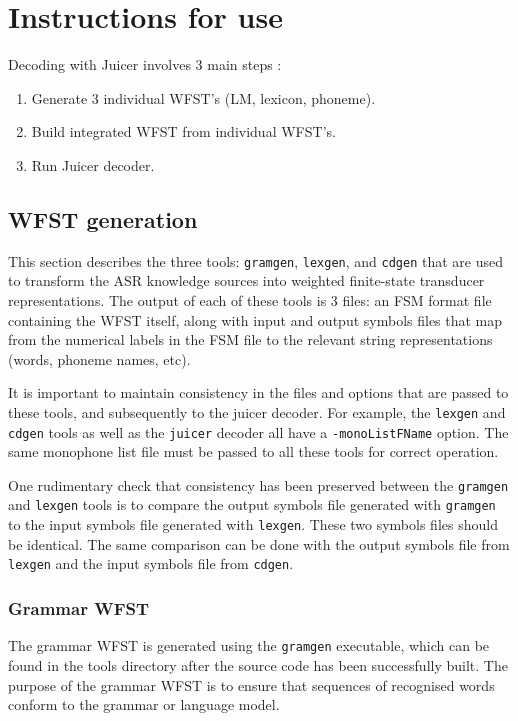 \documentclass[a4paper,12pt]{report}
\begin{document}
\chapter{Instructions for use}

Decoding with Juicer involves 3 main steps :

\begin{enumerate}
\item Generate 3 individual WFST's (LM, lexicon, phoneme).
\item Build integrated WFST from individual WFST's.
\item Run Juicer decoder.
\end{enumerate}

\section{WFST generation}

This section describes the three tools: {\tt gramgen}, {\tt lexgen}, and {\tt cdgen} that are used to transform the ASR knowledge sources into weighted finite-state transducer representations. The output of each of these tools is 3 files: an FSM format file~\cite{attfsmformats} containing the WFST itself, along with input and output symbols files that map from the numerical labels in the FSM file to the relevant string representations (words, phoneme names, etc).

It is important to maintain consistency in the files and options that are passed to these tools, and subsequently to the juicer decoder. For example, the {\tt lexgen} and {\tt cdgen} tools as well as the {\tt juicer} decoder all have a {\tt -monoListFName} option. The same monophone list file must be passed to all these tools for correct operation.

One rudimentary check that consistency has been preserved between the {\tt gramgen} and {\tt lexgen} tools is to compare the output symbols file generated with {\tt gramgen} to the input symbols file generated with {\tt lexgen}. These two symbols files should be identical. The same comparison can be done with the output symbols file from {\tt lexgen} and the input symbols file from {\tt cdgen}.


\subsection{Grammar WFST}

The grammar WFST is generated using the {\tt gramgen} executable, which can be found in the tools directory after the source code has been successfully built. The purpose of the grammar WFST is to ensure that sequences of recognised words conform to the grammar or language model.
\end{document}
